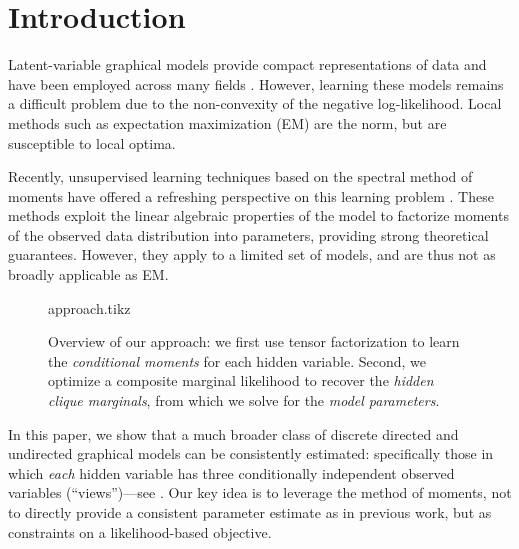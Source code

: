 \section{Introduction}
\label{sec:introduction}

Latent-variable graphical models provide compact representations of data
and have been employed across many fields %
\cite{ghahramani1999variational,jaakkola1999variational,blei03lda,quattoni04crf,beaumont2004bayesian,haghighi06prototype}.
However, learning these models remains a difficult problem due to the
non-convexity of the negative log-likelihood.  Local methods such as expectation maximization (EM)
are the norm, but are susceptible to local optima.

Recently, unsupervised learning techniques based on the spectral method of moments
have offered a refreshing perspective on
this learning problem
\citep{mossel2005learning,
hsu09spectral,
bailly2010spectral,
song2011spectral,
anandkumar11tree,
anandkumar12lda,
anandkumar12moments,
hsu12identifiability,
balle12automata}.
These methods exploit the linear algebraic properties of the model to
factorize moments of the observed data distribution into parameters,
providing strong theoretical guarantees.
However, they apply to a limited set of models, and are thus
not as broadly applicable as EM.

\begin{figure}[t]
  \label{fig:approach}
  \centering
  {approach.tikz}
  \caption{
  Overview of our approach:
  we first use tensor factorization to learn the \emph{conditional moments}
  for each hidden variable.
  Second, we optimize a composite marginal likelihood to recover the \emph{hidden clique marginals},
  from which we solve for the \emph{model parameters}.
  }
\end{figure}


In this paper,
we show that a much broader class of discrete directed and undirected graphical models can be consistently estimated:
specifically those in which \emph{each} hidden variable has three conditionally
independent observed variables (``views'')---see .
Our key idea is to leverage the method of moments,
not to directly provide a consistent parameter estimate as in previous work,
but as constraints on a likelihood-based objective.

